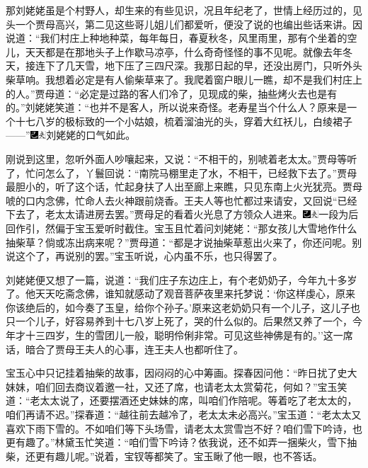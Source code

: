 那刘姥姥虽是个村野人，却生来的有些见识，况且年纪老了，世情上经历过的，见头一个贾母高兴，第二见这些哥儿姐儿们都爱听，便没了说的也编出些话来讲。因说道：``我们村庄上种地种菜，每年每日，春夏秋冬，风里雨里，那有个坐着的空儿，天天都是在那地头子上作歇马凉亭，什么奇奇怪怪的事不见呢。就像去年冬天，接连下了几天雪，地下压了三四尺深。我那日起的早，还没出房门，只听外头柴草响。我想着必定是有人偷柴草来了。我爬着窗户眼儿一瞧，却不是我们村庄上的人。''贾母道：``必定是过路的客人们冷了，见现成的柴，抽些烤火去也是有的。''刘姥姥笑道：``也并不是客人，所以说来奇怪。老寿星当个什么人？原来是一个十七八岁的极标致的一个小姑娘，梳着溜油光的头，穿着大红袄儿，白绫裙子------''{\includegraphics[width=3mm]{../Images/00003}\includegraphics[width=3mm]{../Images/00012}\footnotesize \kaishu 刘姥姥的口气如此。}

刚说到这里，忽听外面人吵嚷起来，又说：``不相干的，别唬着老太太。''贾母等听了，忙问怎么了，丫鬟回说：``南院马棚里走了水，不相干，已经救下去了。''贾母最胆小的，听了这个话，忙起身扶了人出至廊上来瞧，只见东南上火光犹亮。贾母唬的口内念佛，忙命人去火神跟前烧香。王夫人等也忙都过来请安，又回说``已经下去了，老太太请进房去罢。''贾母足的看着火光息了方领众人进来。{\includegraphics[width=3mm]{../Images/00003}\includegraphics[width=3mm]{../Images/00012}\footnotesize \kaishu 一段为后回作引，然偏于宝玉爱听时截住。}宝玉且忙着问刘姥姥：``那女孩儿大雪地作什么抽柴草？倘或冻出病来呢？''贾母道：``都是才说抽柴草惹出火来了，你还问呢。别说这个了，再说别的罢。''宝玉听说，心内虽不乐，也只得罢了。

刘姥姥便又想了一篇，说道：``我们庄子东边庄上，有个老奶奶子，今年九十多岁了。他天天吃斋念佛，谁知就感动了观音菩萨夜里来托梦说：`你这样虔心，原来你该绝后的，如今奏了玉皇，给你个孙子。'原来这老奶奶只有一个儿子，这儿子也只一个儿子，好容易养到十七八岁上死了，哭的什么似的。后果然又养了一个，今年才十三四岁，生的雪团儿一般，聪明伶俐非常。可见这些神佛是有的。''这一席话，暗合了贾母王夫人的心事，连王夫人也都听住了。

宝玉心中只记挂着抽柴的故事，因闷闷的心中筹画。探春因问他：``昨日扰了史大妹妹，咱们回去商议着邀一社，又还了席，也请老太太赏菊花，何如？''宝玉笑道：``老太太说了，还要摆酒还史妹妹的席，叫咱们作陪呢。等着吃了老太太的，咱们再请不迟。''探春道：``越往前去越冷了，老太太未必高兴。''宝玉道：``老太太又喜欢下雨下雪的。不如咱们等下头场雪，请老太太赏雪岂不好？咱们雪下吟诗，也更有趣了。''林黛玉忙笑道：``咱们雪下吟诗？依我说，还不如弄一捆柴火，雪下抽柴，还更有趣儿呢。''说着，宝钗等都笑了。宝玉瞅了他一眼，也不答话。

